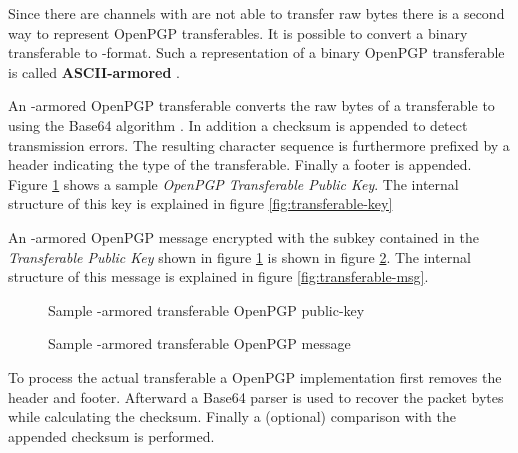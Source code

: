 Since there are channels with are not able to transfer raw bytes there is a second way to represent OpenPGP transferables. It is possible to convert a binary transferable to -format. Such a representation of a binary OpenPGP transferable is called \textbf{ASCII-armored} \cite[section 6]{RFC4880}.

An -armored OpenPGP transferable converts the raw bytes of a transferable to  using the Base64 algorithm \citep{RFC4648}. In addition a  \cite[section 6.1]{RFC4880} checksum is appended to detect transmission errors. The resulting character sequence is furthermore prefixed by a header indicating the type of the transferable. Finally a footer is appended. \\

Figure \ref{fig:key} shows a sample \textit{OpenPGP Transferable Public Key}. The internal structure of this key is explained in figure \ref{fig:transferable-key}

An -armored OpenPGP message encrypted with the subkey contained in the \textit{Transferable Public Key} shown in figure \ref{fig:key} is shown in figure \ref{fig:msg}. The internal structure of this message is explained in figure \ref{fig:transferable-msg}. \\

\begin{figure}[p]
	\centering
	
	\caption{Sample -armored transferable OpenPGP public-key}
	\label{fig:key}
\end{figure}

\begin{figure}[p]
	\centering
	
	\caption{Sample -armored transferable OpenPGP message}
	\label{fig:msg}
\end{figure}

To process the actual transferable a OpenPGP implementation first removes the header and footer. Afterward a Base64 parser is used to recover the packet bytes while calculating the  checksum. Finally a (optional) comparison with the appended checksum is performed.




